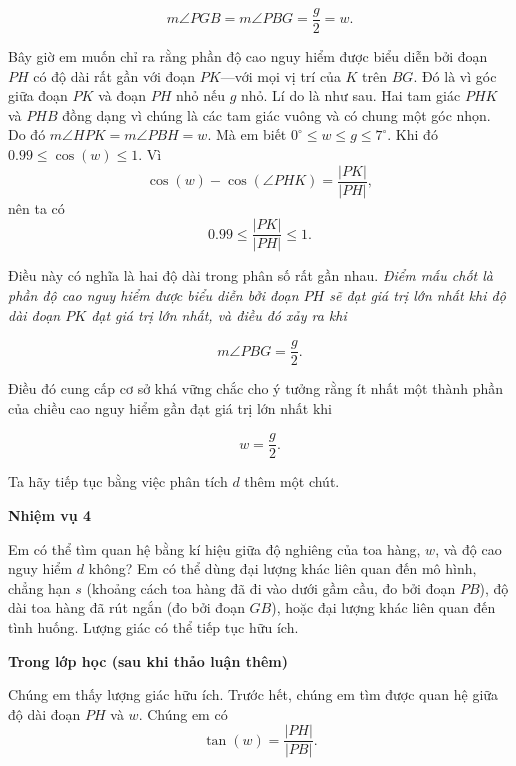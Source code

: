 {\begin{scriptlist}
      $$
        m\angle PGB=m\angle PBG=\frac{g}{2}=w.
      $$

      Bây giờ em muốn chỉ ra rằng phần độ cao nguy hiểm được biểu diễn bởi đoạn $PH$ có độ dài rất gần với đoạn $PK$---với mọi vị trí của $K$ trên $BG$. Đó là vì góc giữa đoạn $PK$ và đoạn $PH$ nhỏ nếu $g$ nhỏ. Lí do là như sau. Hai tam giác $PHK$ và $PHB$ đồng dạng vì chúng là các tam giác vuông và có chung một góc nhọn. Do đó $m\angle HPK = m\angle PBH = w$. Mà em biết $0^\circ \leq w \leq g \leq 7^\circ$. Khi đó $0.99 \leq \cos(w) \leq 1$. Vì
      $$
        \cos(w)-\cos(\angle PHK)=\frac{\lvert PK\rvert}{\lvert PH\rvert},
      $$
      nên ta có
      $$
        0.99\leq \frac{\lvert PK\rvert}{\lvert PH\rvert}\leq 1.
      $$

      Điều này có nghĩa là hai độ dài trong phân số rất gần nhau. \emph{Điểm mấu chốt là phần độ cao nguy hiểm được biểu diễn bởi đoạn $PH$ sẽ đạt giá trị lớn nhất khi độ dài đoạn $PK$ đạt giá trị lớn nhất, và điều đó xảy ra khi}\vspace{\baselineskip}

      $$
        m\angle PBG=\frac{g}{2}.
      $$

      \item [Giáo viên:] Điều đó cung cấp cơ sở khá vững chắc cho ý tưởng rằng ít nhất một thành phần của chiều cao nguy hiểm gần đạt giá trị lớn nhất khi

      $$
        w=\frac{g}{2}.
      $$

      Ta hãy tiếp tục bằng việc phân tích $d$ thêm một chút.
    \end{scriptlist}

    \textbf{Nhiệm vụ 4}

    Em có thể tìm quan hệ bằng kí hiệu giữa độ nghiêng của toa hàng, $w$, và độ cao nguy hiểm $d$ không? Em có thể dùng đại lượng khác liên quan đến mô hình, chẳng hạn $s$ (khoảng cách toa hàng đã đi vào dưới gầm cầu, đo bởi đoạn $PB$), độ dài toa hàng đã rút ngắn (đo bởi đoạn $GB$), hoặc đại lượng khác liên quan đến tình huống. Lượng giác có thể tiếp tục hữu ích. \vspace{2\baselineskip}

    \textbf{Trong lớp học (sau khi thảo luận thêm)} \vspace{\baselineskip}

    \begin{scriptlist}
      \item [Nhóm 5:] Chúng em thấy lượng giác hữu ích. Trước hết, chúng em tìm được quan hệ giữa độ dài đoạn $PH$ và $w$. Chúng em có
      $$
        \tan(w)=\frac{\lvert PH\rvert}{\lvert PB\rvert}.
      $$


\end{scriptlist}}
